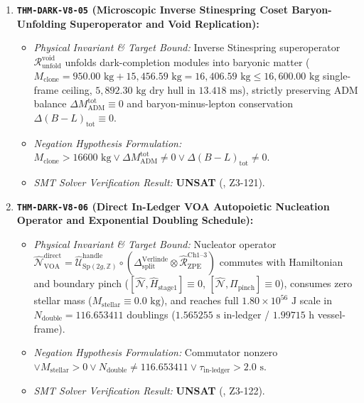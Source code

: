 \documentclass[11pt,onecolumn]{article}
\begin{document}
\begin{enumerate}
\begin{itemize}
        \item \emph{SMT Solver Verification Result:} \textbf{UNSAT} (, Z3-120).
    \end{itemize}
    \item \textbf{\texttt{THM-DARK-V8-05} (Microscopic Inverse Stinespring Coset Baryon-Unfolding Superoperator and Void Replication):}
    \begin{itemize}
        \item \emph{Physical Invariant \& Target Bound:} Inverse Stinespring superoperator $\mathcal{R}_{\text{unfold}}^{\text{void}}$ unfolds dark-completion modules into baryonic matter ($M_{\text{clone}} = 950.00\text{ kg} + 15,456.59\text{ kg} = 16,406.59\text{ kg} \le 16,600.00\text{ kg}$ single-frame ceiling, $5,892.30\text{ kg}$ dry hull in $13.418\text{ ms}$), strictly preserving ADM balance $\Delta M_{\text{ADM}}^{\text{tot}} \equiv 0$ and baryon-minus-lepton conservation $\Delta(B-L)_{\text{tot}} \equiv 0$.
        \item \emph{Negation Hypothesis Formulation:} $M_{\text{clone}} > 16600\text{ kg} \vee \Delta M_{\text{ADM}}^{\text{tot}} \neq 0 \vee \Delta(B-L)_{\text{tot}} \neq 0$.
        \item \emph{SMT Solver Verification Result:} \textbf{UNSAT} (, Z3-121).
    \end{itemize}
    \item \textbf{\texttt{THM-DARK-V8-06} (Direct In-Ledger VOA Autopoietic Nucleation Operator and Exponential Doubling Schedule):}
    \begin{itemize}
        \item \emph{Physical Invariant \& Target Bound:} Nucleator operator $\hat{\mathcal{N}}_{\text{VOA}}^{\text{direct}} = \hat{\mathcal{U}}_{\text{Sp}(2g,\mathbb{Z})}^{\text{handle}} \circ (\Delta_{\text{split}}^{\text{Verlinde}} \otimes \hat{\mathcal{R}}_{\text{ZPE}}^{\text{Ch1--3}})$ commutes with Hamiltonian and boundary pinch ($[\hat{\mathcal{N}}, \hat{H}_{\text{stage1}}] \equiv 0$, $[\hat{\mathcal{N}}, \Pi_{\text{pinch}}] \equiv 0$), consumes zero stellar mass ($M_{\text{stellar}} \equiv 0.0\text{ kg}$), and reaches full $1.80 \times 10^{56}\text{ J}$ scale in $N_{\text{double}} = 116.653411$ doublings ($1.565255\text{ s}$ in-ledger / $1.99715\text{ h}$ vessel-frame).
        \item \emph{Negation Hypothesis Formulation:} Commutator nonzero $\vee M_{\text{stellar}} > 0 \vee N_{\text{double}} \neq 116.653411 \vee \tau_{\text{in-ledger}} > 2.0\text{ s}$.
        \item \emph{SMT Solver Verification Result:} \textbf{UNSAT} (, Z3-122).
    \end{itemize}
\end{enumerate}
\end{document}

